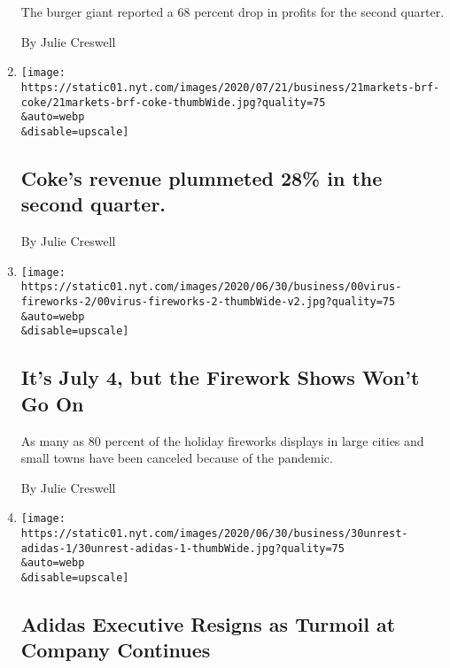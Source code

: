 \begin{enumerate}
  The burger giant reported a 68 percent drop in profits for the second
  quarter.

  By Julie Creswell
\item
  \href{/live/2020/07/21/business/stock-market-today-coronavirus/cokes-revenue-plummeted-28-in-the-second-quarter}{}

  \texttt{[image: https://static01.nyt.com/images/2020/07/21/business/21markets-brf-coke/21markets-brf-coke-thumbWide.jpg?quality=75\\\&auto=webp\\\&disable=upscale]}

  \hypertarget{cokes-revenue-plummeted-28-in-the-second-quarter}{%
  \subsection{Coke's revenue plummeted 28\% in the second
  quarter.}\label{cokes-revenue-plummeted-28-in-the-second-quarter}}

  By Julie Creswell
\item
  \href{/2020/07/01/business/fourth-of-july-fireworks-displays.html}{}

  \texttt{[image: https://static01.nyt.com/images/2020/06/30/business/00virus-fireworks-2/00virus-fireworks-2-thumbWide-v2.jpg?quality=75\\\&auto=webp\\\&disable=upscale]}

  \hypertarget{its-july-4-but-the-firework-shows-wont-go-on}{%
  \subsection{It's July 4, but the Firework Shows Won't Go
  On}\label{its-july-4-but-the-firework-shows-wont-go-on}}

  As many as 80 percent of the holiday fireworks displays in large
  cities and small towns have been canceled because of the pandemic.

  By Julie Creswell
\item
  \href{/2020/06/30/business/adidas-karen-parkin-resigns.html}{}

  \texttt{[image: https://static01.nyt.com/images/2020/06/30/business/30unrest-adidas-1/30unrest-adidas-1-thumbWide.jpg?quality=75\\\&auto=webp\\\&disable=upscale]}

  \hypertarget{adidas-executive-resigns-as-turmoil-at-company-continues}{%
  \subsection{Adidas Executive Resigns as Turmoil at Company
  Continues}\label{adidas-executive-resigns-as-turmoil-at-company-continues}}


\end{enumerate}
